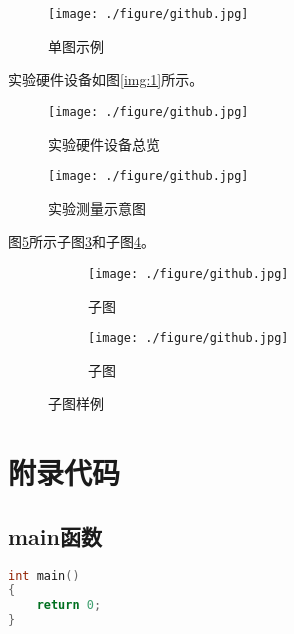 \documentclass[winfonts,master,twoside,AutoFakeBold= {2}]{njuthesis}
\begin{document}
\begin{figure}[htbp]
  \centering
  \texttt{[image: ./figure/github.jpg]}
  \caption{单图示例}
  \label{fig:system}
\end{figure}

实验硬件设备如图\ref{img:1}所示。
\begin{figure}[htbp]
\begin{minipage}[t]{0.5\textwidth}
\centering
\texttt{[image: ./figure/github.jpg]}
\caption{实验硬件设备总览}
\label{img:1}
\end{minipage}
\begin{minipage}[t]{0.5\textwidth}
\centering
\texttt{[image: ./figure/github.jpg]}
\caption{实验测量示意图}
\label{img:2}
\end{minipage}
\end{figure}

图\ref{fig:sub}所示子图\ref{subfig:a}和子图\ref{subfig:b}。
\begin{figure}[H]
	\begin{subfigure}{.5\textwidth}
		\centering
		\texttt{[image: ./figure/github.jpg]}
		\caption{子图}
		\label{subfig:a}
	\end{subfigure}
	\begin{subfigure}{.5\textwidth}
		\centering
		\texttt{[image: ./figure/github.jpg]}
		\caption{子图}
		\label{subfig:b}
	\end{subfigure}
\caption{子图样例}
\label{fig:sub}
\end{figure}







\appendix
\chapter{附录代码}\label{app:1}
\section{main函数}
\begin{lstlisting}[language=C]
int main()
{
	return 0;
}
\end{lstlisting}


\begin{acknowledgement}
    \lipsum[1]

\end{acknowledgement}
\end{document}
